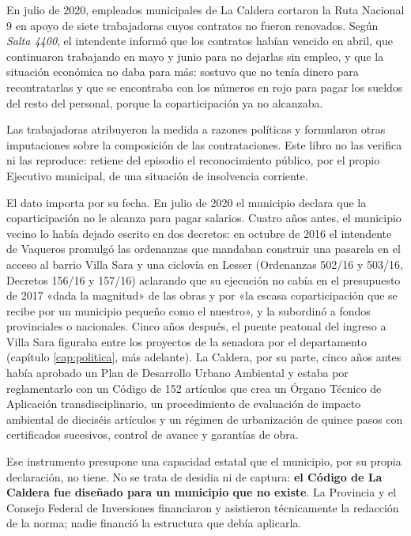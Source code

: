 En julio de 2020, empleados municipales de La Caldera cortaron la Ruta Nacional 9 en apoyo de siete trabajadoras cuyos contratos no fueron renovados. Según \textit{Salta 4400}, el intendente informó que los contratos habían vencido en abril, que continuaron trabajando en mayo y junio para no dejarlas sin empleo, y que la situación económica no daba para más: sostuvo que no tenía dinero para recontratarlas y que se encontraba con los números en rojo para pagar los sueldos del resto del personal, porque la coparticipación ya no alcanzaba.

Las trabajadoras atribuyeron la medida a razones políticas y formularon otras imputaciones sobre la composición de las contrataciones. Este libro no las verifica ni las reproduce: retiene del episodio el reconocimiento público, por el propio Ejecutivo municipal, de una situación de insolvencia corriente.

El dato importa por su fecha. En julio de 2020 el municipio declara que la coparticipación no le alcanza para pagar salarios. Cuatro años antes, el municipio vecino lo había dejado escrito en dos decretos: en octubre de 2016 el intendente de Vaqueros promulgó las ordenanzas que mandaban construir una pasarela en el acceso al barrio Villa Sara y una ciclovía en Lesser (Ordenanzas 502/16 y 503/16, Decretos 156/16 y 157/16) aclarando que su ejecución no cabía en el presupuesto de 2017 «dada la magnitud» de las obras y por «la escasa coparticipación que se recibe por un municipio pequeño como el nuestro», y la subordinó a fondos provinciales o nacionales. Cinco años después, el puente peatonal del ingreso a Villa Sara figuraba entre los proyectos de la senadora por el departamento (capítulo \ref{cap:politica}, más adelante). La Caldera, por su parte, cinco años antes había aprobado un Plan de Desarrollo Urbano Ambiental y estaba por reglamentarlo con un Código de 152 artículos que crea un Órgano Técnico de Aplicación transdisciplinario, un procedimiento de evaluación de impacto ambiental de dieciséis artículos y un régimen de urbanización de quince pasos con certificados sucesivos, control de avance y garantías de obra.

Ese instrumento presupone una capacidad estatal que el municipio, por su propia declaración, no tiene. No se trata de desidia ni de captura: \textbf{el Código de La Caldera fue diseñado para un municipio que no existe}. La Provincia y el Consejo Federal de Inversiones financiaron y asistieron técnicamente la redacción de la norma; nadie financió la estructura que debía aplicarla.

